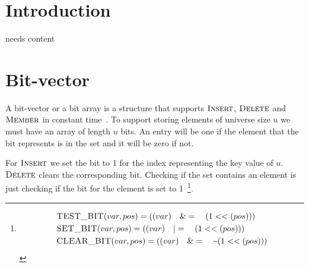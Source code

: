\documentclass[oneside,11pt,openright]{report}
\newcommand{\Insert}{\textsc{Insert}}
\newcommand{\Delete}{\textsc{Delete}}
\newcommand{\Member}{\textsc{Member}}
\begin{document}

\pagestyle{empty} 
\vspace*{\fill}
\clearpage


\tableofcontents
{}
\setcounter{secnumdepth}{2}


\chapter{Introduction}

needs content

\chapter{Bit-vector}

A bit-vector or a bit array is a structure that supports $\Insert$, $\Delete$ and $\Member$ in constant time~\cite[p. 532]{ITA09}. To support storing elements of universe size $u$ we must have an array of length $u$ bits. An entry will be one if the element that the bit represents is in the set and it will be zero if not.

For $\Insert$ we set the bit to 1 for the index representing the key value of $u$. $\Delete$ clears the corresponding bit. Checking if the set contains an element is just checking if the bit for the element is set to 1~\footnote{\begin{align*}
& \textsc{TEST\_BIT}(var,pos) = ((var)\quad \&=\quad(1<<(pos))) \\
& \textsc{SET\_BIT}(var,pos)  = ((var)\quad|=\quad(1<<(pos))) \\
& \textsc{CLEAR\_BIT}(var,pos)  = ((var)\quad\&=\quad\textsf{\textasciitilde}(1<<(pos)))
\end{align*}}.
\end{document}
